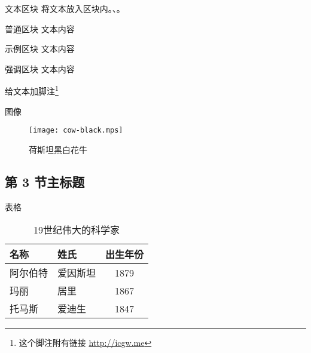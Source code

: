 \documentclass[]{beamer}
\begin{document}
\begin{frame}{文本区块}
	将文本放入区块内。、。
	\begin{block}{普通区块}
		文本内容
	\end{block}
	\begin{exampleblock}{示例区块}
		文本内容
	\end{exampleblock}
	\begin{alertblock}{强调区块}
		文本内容
	\end{alertblock}
	给文本加脚注\footnote{这个脚注附有链接 \url{http://icgw.me}}
\end{frame}

\begin{frame}{图像}
	\begin{figure}
		\texttt{[image: cow-black.mps]}
		\caption{荷斯坦黑白花牛}
	\end{figure}
\end{frame}

\subsection[第 3 节缩写标题]{第 3 节主标题}

\begin{frame}{表格}
	\begin{table}
		\begin{tabular}{llc}
			名称     & 姓氏     & 出生年份 \\ \midrule
			阿尔伯特 & 爱因斯坦 & 1879     \\
			玛丽     & 居里     & 1867     \\
			托马斯   & 爱迪生   & 1847     \\
		\end{tabular}
		\caption{19世纪伟大的科学家}
	\end{table}
\end{frame}
\end{document}
